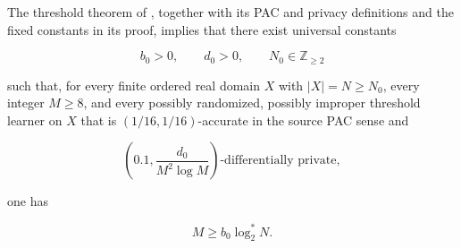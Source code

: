 \begin{lemma}\label{lem:step-002-almm-constants}
The threshold theorem of \citet[Theorem~1]{AlonLivniMalliarisMoran2019},
together with its PAC and privacy definitions and the fixed constants in its
proof, implies that there exist universal constants

\[
b_0>0,\qquad d_0>0,\qquad N_0\in\mathbb Z_{\ge2}
\]

such that, for every finite ordered real domain \(X\) with \(|X|=N\ge N_0\), every integer \(M\ge8\), and every possibly randomized, possibly improper threshold learner on \(X\) that is \((1/16,1/16)\)-accurate in the source PAC sense and

\[
\left(0.1,\frac{d_0}{M^2\log M}\right)
\text{-differentially private},
\]

one has

\[
M\ge b_0\log_2^*N.
\]
\end{lemma}

